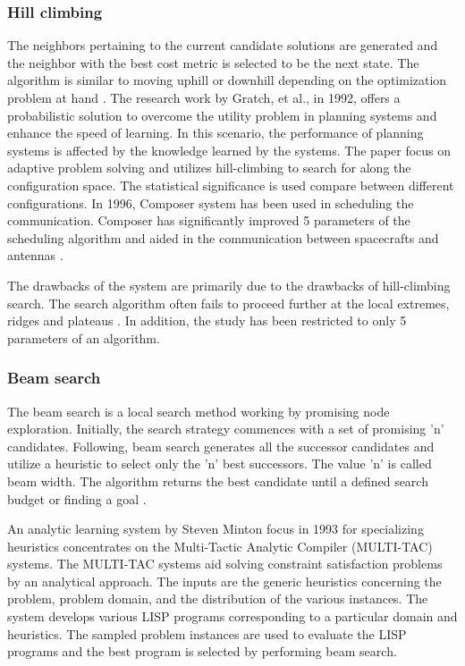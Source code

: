 \subsubsection{Hill climbing}

The neighbors pertaining to the current candidate solutions are generated and the neighbor with the best cost metric is selected to be the next state. The algorithm is similar to moving uphill or downhill depending on the optimization problem at hand \cite{Russell_Norvig}. The research work by Gratch, et al., \cite{Gratch_1992} in 1992, offers a probabilistic solution to overcome the utility problem in planning systems and enhance the speed of learning. In this scenario, the performance of planning systems is affected by the knowledge learned by the systems. The paper focus on adaptive problem solving and utilizes hill-climbing to search for along the configuration space. The statistical significance is used compare between different configurations. In 1996, Composer system has been used in scheduling the communication. Composer has significantly improved 5 parameters of the scheduling algorithm and aided in the communication between spacecrafts and antennas \cite{Gratch_1996}.

The drawbacks of the system are primarily due to the drawbacks of hill-climbing search. The search algorithm often fails to proceed further at the local extremes, ridges and plateaus \cite{Russell_Norvig}. In addition, the study has been restricted to only 5 parameters of an algorithm. 

\subsubsection{Beam search}

The beam search is a local search method working by promising node exploration. Initially, the search strategy commences with a set of promising 'n' candidates. Following, beam search generates all the successor candidates and utilize a heuristic to select only the 'n' best successors. The value 'n' is called beam width. The algorithm returns the best candidate until a defined search budget or finding a goal \cite{Russell_Norvig}.

An analytic learning system by Steven Minton focus in 1993 \cite{Minton_1993} for specializing heuristics concentrates on the Multi-Tactic Analytic Compiler (MULTI-TAC) systems. The MULTI-TAC systems aid solving constraint satisfaction problems by an analytical approach. The inputs are the generic heuristics concerning the problem, problem domain, and the distribution of the various instances. The system develops various LISP programs corresponding to a particular domain and heuristics. The sampled problem instances are used to evaluate the LISP programs and the best program is selected by performing beam search. 

